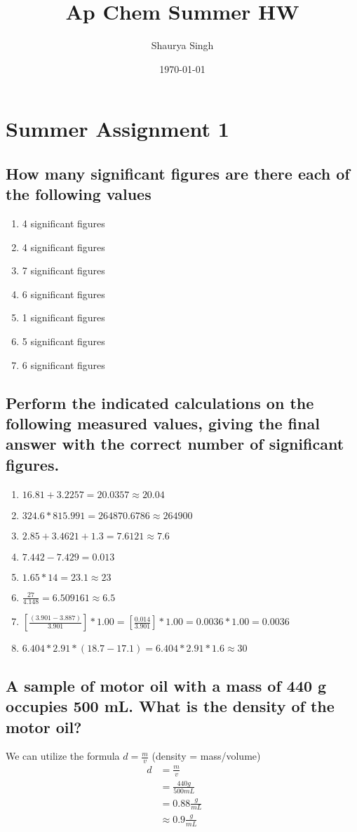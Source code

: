 \documentclass[11pt]{article}
\author{Shaurya Singh}
\date{\today}
\title{Ap Chem Summer HW}
\begin{document}
\maketitle

\section{Summer Assignment 1}
\label{sec:org3c137eb}
\subsection{How many significant figures are there each of the following values}
\label{sec:org98e3662}
\begin{enumerate}
\item 4 significant figures
\item 4 significant figures
\item 7 significant figures
\item 6 significant figures
\item 1 significant figures
\item 5 significant figures
\item 6 significant figures
\end{enumerate}

\subsection{Perform the indicated calculations on the following measured values, giving the final answer with the correct number of significant figures.}
\label{sec:orgc065584}
\begin{enumerate}
\item \(16.81 + 3.2257 = 20.0357 \approx 20.04\)
\item \(324.6 * 815.991 = 264870.6786 \approx 264900\)
\item \(2.85 + 3.4621 + 1.3 = 7.6121 \approx 7.6\)
\item \(7.442 - 7.429 = 0.013\)
\item \(1.65 * 14 = 23.1 \approx 23\)
\item \(\frac{27}{4.148} = 6.509161 \approx 6.5\)
\item \([\frac{(3.901 - 3.887)}{3.901}] * 1.00 = [\frac{0.014}{3.901}] * 1.00 = 0.0036 * 1.00 = 0.0036\)
\item \(6.404 * 2.91 * (18.7 - 17.1) = 6.404 * 2.91 * 1.6 \approx 30\)
\end{enumerate}

\subsection{A sample of motor oil with a mass of 440 g occupies 500 mL. What is the density of the motor oil?}
\label{sec:org257ff7f}
We can utilize the formula \(d=\frac{m}{v}\) (density = mass/volume)
\begin{align}
d&=\frac{m}{v} &&\\\nonumber
            &=\frac{440g}{500mL}&&\\\nonumber
            &=0.88\frac{g}{mL}&&\\\nonumber
            &\approx0.9\frac{g}{mL}&&
\end{align}
\end{document}
